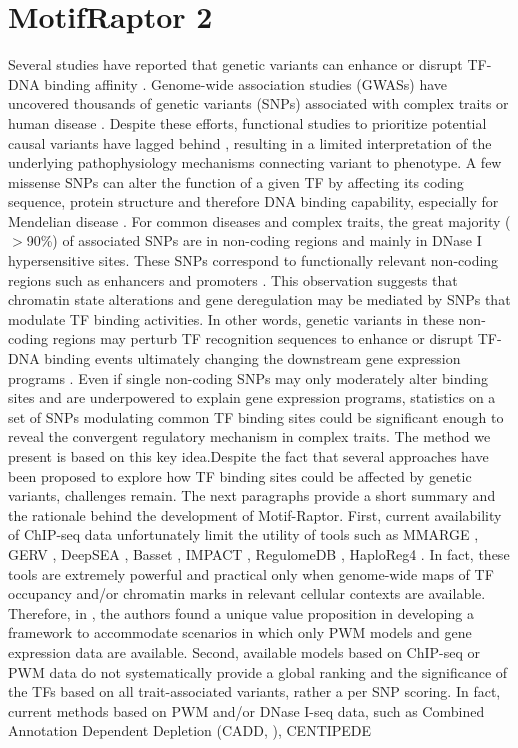 \documentclass[a4paper, titlepage, openright]{book}
\newcommand{\motifraptor}{MotifRaptor\xspace}
\begin{document}
\section{\motifraptor2}
Several studies have reported that genetic variants can enhance or disrupt TF-DNA binding affinity \citep{de2006regulatory, weinhold2014genome, wienert2015editing}. Genome-wide association studies (GWASs) have uncovered thousands of genetic variants (SNPs) associated with complex traits or human disease \citep{buniello2019nhgri}. Despite these efforts, functional studies to prioritize potential causal variants have lagged behind \citep{gallagher2018post}, resulting in a limited interpretation of the underlying pathophysiology mechanisms connecting variant to phenotype. A few missense SNPs can alter the function of a given TF by affecting its coding sequence, protein structure and therefore DNA binding capability, especially for Mendelian disease \citep{barrera2016survey}. For common diseases and complex traits, the great majority ($>$90\%) of associated SNPs are in non-coding regions and mainly in DNase I hypersensitive sites. These SNPs correspond to functionally relevant non-coding regions such as enhancers and promoters \citep{maurano2012systematic}. This observation suggests that chromatin state alterations and gene deregulation may be mediated by SNPs that modulate TF binding activities. In other words, genetic variants in these non-coding regions may perturb TF recognition sequences to enhance or disrupt TF-DNA binding events ultimately changing the downstream gene expression programs \citep{deplancke2016genetics}. Even if single non-coding SNPs may only moderately alter binding sites and are underpowered to explain gene expression programs, statistics on a set of SNPs modulating common TF binding sites could be significant enough to reveal the convergent regulatory mechanism in complex traits. The method we present is based on this key idea.Despite the fact that several approaches have been proposed to explore how TF binding sites could be affected by genetic variants, challenges remain. The next paragraphs provide a short summary and the rationale behind the development of Motif-Raptor. First, current availability of ChIP-seq data unfortunately limit the utility of tools such as MMARGE \citep{link2018mmarge}, GERV \citep{zeng2016gerv}, DeepSEA \citep{zhou2015predicting}, Basset \citep{kelley2016basset}, IMPACT \citep{amariuta2019impact}, RegulomeDB \citep{boyle2012annotation}, HaploReg4 \citep{ward2012haploreg}. In fact, these tools are extremely powerful and practical only when genome-wide maps of TF occupancy and/or chromatin marks in relevant cellular contexts are available. Therefore, in \citep{yao2021motif}, the authors found a unique value proposition in developing a framework to accommodate scenarios in which only PWM models and gene expression data are available. Second, available models based on ChIP-seq or PWM data do not systematically provide a global ranking and the significance of the TFs based on all trait-associated variants, rather a per SNP scoring. In fact, current methods based on PWM and/or DNase I-seq data, such as Combined Annotation Dependent Depletion (CADD, \citep{maurano2015large}), CENTIPEDE 
\end{document}
